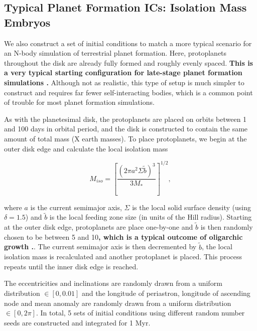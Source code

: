 \subsection{Typical Planet Formation ICs: Isolation Mass Embryos}

We also construct a set of initial conditions to match a more typical scenario for an N-body simulation of terrestrial planet formation. Here, protoplanets throughout the disk are already fully formed and roughly evenly spaced. \textbf{This is a very typical starting configuration for late-stage planet formation simulations \cite{kokubo02, raymond05, raymond06}.} Although not as realistic, this type of setup is much simpler to construct and requires far fewer self-interacting bodies, which is a common point of trouble for most planet  formation simulations.

As with the planetesimal disk, the protoplanets are placed on orbits between 1 and 100 days in orbital period, and the disk is constructed to contain the same amount of total mass (X earth masses). To place protoplanets, we begin at the outer disk edge and calculate the local isolation mass \cite{kokubo02}


\begin{equation}\label{eq:iso}
	M_{iso} = \left[ \frac{\left( 2 \pi a^2 \Sigma \tilde{b} \right)^3}{3 M_{*}} \right]^{1/2},
\end{equation}

\noindent where $a$ is the current semimajor axis, $\Sigma$ is the local solid surface density (using $\delta = 1.5$) and $\tilde{b}$ is the local feeding zone size (in units of the Hill radius). Starting at the outer disk edge, protoplanets are place one-by-one and $\tilde{b}$ is then randomly chosen to be between 5 and 10\textbf{, which is a typical outcome of oligarchic growth \cite{kokubo02}.}. The current semimajor axis is then decremented by $\tilde{b}$, the local isolation mass is recalculated and another protoplanet is placed. This process repeats until the inner disk edge is reached.

The eccentricities and inclinations are randomly drawn from a uniform distribution $\in \left[ 0, 0.01 \right]$ and the longitude of periastron, longitude of ascending node and mean anomaly are randomly drawn from a uniform distribution $\in \left[ 0, 2 \pi \right]$. In total, 5 sets of initial conditions using different random number seeds are constructed and integrated for 1 Myr.

